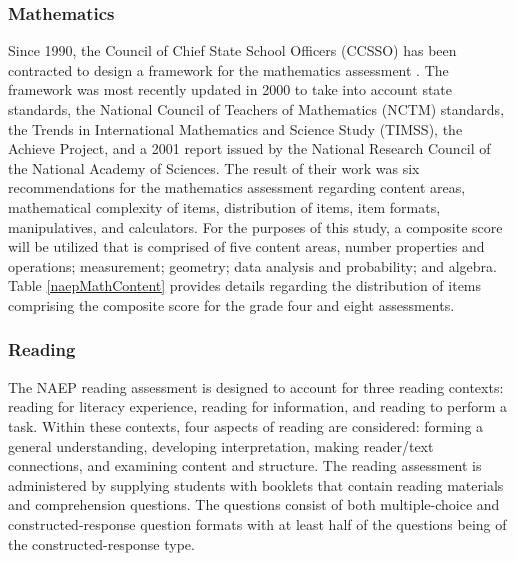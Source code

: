 \documentclass[letterpaper,12p,twoside]{article} %
\begin{document}
\subsubsection{Mathematics}

Since 1990, the Council of Chief State School Officers (CCSSO) has been contracted to design a framework for the mathematics assessment \cite{naepmath}. The framework was most recently updated in 2000 to take into account state standards, the National Council of Teachers of Mathematics (NCTM) standards, the Trends in International Mathematics and Science Study (TIMSS), the Achieve Project, and a 2001 report issued by the National Research Council of the National Academy of Sciences. The result of their work was six recommendations for the mathematics assessment regarding content areas, mathematical complexity of items, distribution of items, item formats, manipulatives, and calculators. For the purposes of this study, a composite score will be utilized that is comprised of five content areas, number properties and operations; measurement; geometry; data analysis and probability; and algebra. Table \ref{naepMathContent} provides details regarding the distribution of items comprising the composite score for the grade four and eight assessments.



\subsubsection{Reading}

The NAEP reading assessment \cite{naepreading} is designed to account for three reading contexts: reading for literacy experience, reading for information, and reading to perform a task. Within these contexts, four aspects of reading are considered: forming a general understanding, developing interpretation, making reader/text connections, and examining content and structure. The reading assessment is administered by supplying students with booklets that contain reading materials and comprehension questions. The questions consist of both multiple-choice and constructed-response question formats with at least half of the questions being of the constructed-response type. 
\end{document}
